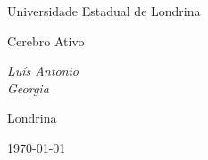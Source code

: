 \begin{titlepage}
  \centering
  \vspace*{2cm}
  {\Large Universidade Estadual de Londrina \par}
  \vspace{3cm}
  {\Huge Cerebro Ativo \par}
  \vspace{2cm}
  {\Large\itshape Luís Antonio \\ Georgia \par}
  \vfill
  {\large Londrina \par}
  {\Large \today \par}
\end{titlepage}
